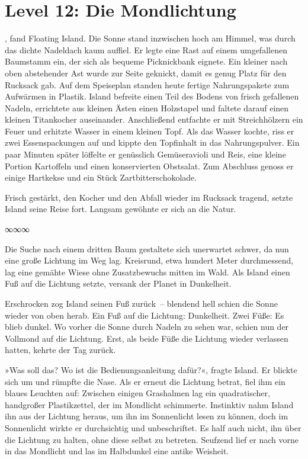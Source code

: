 \section{Level 12: Die Mondlichtung}

, fand Floating Island. Die Sonne stand inzwischen hoch am Himmel, was durch das dichte Nadeldach kaum auffiel. Er legte eine Rast auf einem umgefallenen Baumstamm ein, der sich als bequeme Picknickbank eignete. Ein kleiner nach oben abstehender Ast wurde zur Seite geknickt, damit es genug Platz für den Rucksack gab. Auf dem Speiseplan standen heute fertige Nahrungspakete zum Aufwärmen in Plastik. Island befreite einen Teil des Bodens von frisch gefallenen Nadeln, errichtete aus kleinen Ästen einen Holzstapel und faltete darauf einen kleinen Titankocher auseinander. Anschließend entfachte er mit Streichhölzern ein Feuer und erhitzte Wasser in einem kleinen Topf. Als das Wasser kochte, riss er zwei Essenspackungen auf und kippte den Topfinhalt in das Nahrungspulver. Ein paar Minuten später löffelte er genüsslich Gemüseravioli und Reis, eine kleine Portion Kartoffeln und einen konservierten Obstsalat. Zum Abschluss genoss er einige Hartkekse und ein Stück Zartbitterschokolade.

Frisch gestärkt, den Kocher und den Abfall wieder im Rucksack tragend, setzte Island seine Reise fort. Langsam gewöhnte er sich an die Natur.

\begin{center}
∞∞∞
\end{center}

Die Suche nach einem dritten Baum gestaltete sich unerwartet schwer, da nun eine große Lichtung im Weg lag. Kreisrund, etwa hundert Meter durchmessend, lag eine gemähte Wiese ohne Zusatzbewuchs mitten im Wald. Als Island einen Fuß auf die Lichtung setzte, versank der Planet in Dunkelheit.

Erschrocken zog Island seinen Fuß zurück~– blendend hell schien die Sonne wieder von oben herab. Ein Fuß auf die Lichtung: Dunkelheit. Zwei Füße: Es blieb dunkel. Wo vorher die Sonne durch Nadeln zu sehen war, schien nun der Vollmond auf die Lichtung. Erst, als beide Füße die Lichtung wieder verlassen hatten, kehrte der Tag zurück.

»Was soll das? Wo ist die Bedienungsanleitung dafür?«, fragte Island. Er blickte sich um und rümpfte die Nase. Als er erneut die Lichtung betrat, fiel ihm ein blaues Leuchten auf: Zwischen einigen Grashalmen lag ein quadratischer, handgroßer Plastikzettel, der im Mondlicht schimmerte. Instinktiv nahm Island ihn aus der Lichtung heraus, um ihn im Sonnenlicht lesen zu können, doch im Sonnenlicht wirkte er durchsichtig und unbeschriftet. Es half auch nicht, ihn über die Lichtung zu halten, ohne diese selbst zu betreten. Seufzend lief er nach vorne in das Mondlicht und las im Halbdunkel eine antike Weisheit.

